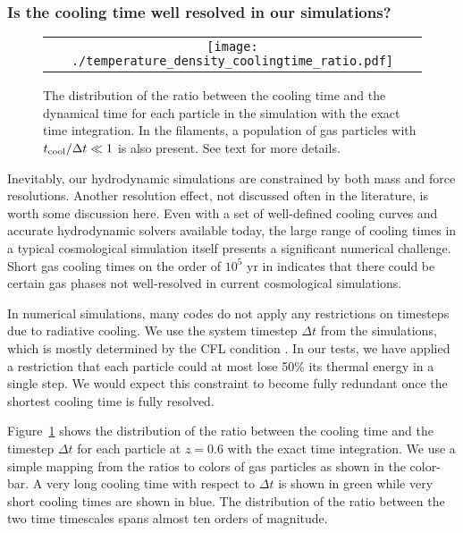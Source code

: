 \documentclass[a4paper,fleqn,usenatbib,useAMS, twocolumn]{mnras}
\begin{document}
\subsubsection{Is the cooling time well resolved in our simulations?}

\begin{figure}
\begin{center}
\begin{tabular}{c}
\texttt{[image: ./temperature\_density\_coolingtime\_ratio.pdf]}\\
\end{tabular}
\caption{\label{fig:coolingtime_ratio_distribution} The distribution of the ratio between 
the cooling time and the dynamical time for each particle in the simulation with the
exact time integration. In the filaments, a population of gas particles with 
$t_{\rm cool}/{\Delta t} \ll 1$ is also present. See text for more details. }
\end{center}
\end{figure}


Inevitably, our hydrodynamic simulations are constrained by both 
mass and force resolutions. Another resolution effect, not discussed 
often in the literature, is worth some discussion here. Even with a 
set of well-defined cooling curves and accurate hydrodynamic solvers 
available today, the large range of cooling times in a typical cosmological 
simulation itself presents a significant numerical challenge. Short gas 
cooling times on the order of $10^5$ yr in \cite{Wiersma2009} indicates 
that there could be certain gas phases not well-resolved in current 
cosmological simulations.

In numerical simulations, many codes do not apply any restrictions on timesteps due to radiative
cooling. We use the system timestep $\Delta t$ from the simulations, which is mostly determined
by the CFL condition \citep{Saitoh2010}. In our tests, we have applied a restriction that each particle 
could at most lose 50\% its thermal energy in a single step. We would expect this constraint 
to become fully redundant once the shortest cooling time is fully resolved.

Figure~\ref{fig:coolingtime_ratio_distribution} 
shows the distribution of the ratio between the cooling time and the timestep $\Delta t$ for each 
particle at $z = 0.6$ with the exact time integration. We use a simple mapping from the ratios
to colors of gas particles as shown in the color-bar. A very long cooling time with respect to $\Delta t$ 
is shown in green while very short cooling times are shown in blue. The distribution of the ratio
between the two time timescales spans almost ten orders of magnitude. 
\end{document}
